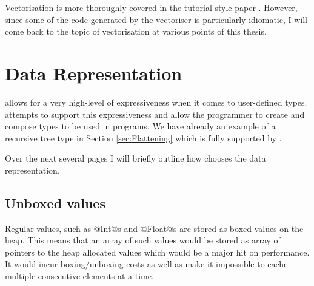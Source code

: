 \documentclass[preamble.tex]{subfiles}
\begin{document}



Vectorisation is more thoroughly covered in the tutorial-style paper \cite{PLKC08}. However, since some of the code generated by the vectoriser is particularly idiomatic, I will come back to the topic of vectorisation at various points of this thesis.



\section{Data Representation}
\label{sec:DPH-Data-Representation}

\Haskell allows for a very high-level of expressiveness when it comes to user-defined types. \DPH attempts to support this expressiveness and allow the programmer to create and compose types to be used in \DPH programs. We have already an example of a recursive tree type in Section \ref{sec:Flattening} which is fully supported by \DPH.

Over the next several pages I will briefly outline how \DPH chooses the data representation.


\subsection{Unboxed values}
\iboxing{}

Regular \Haskell values, such as @Int@s and @Float@s are stored as boxed values on the heap. This means that an array of such values would be stored as array of pointers to the heap allocated values which would be a major hit on performance. It would incur boxing/unboxing costs as well as make it impossible to cache multiple consecutive elements at a time.
\end{document}
